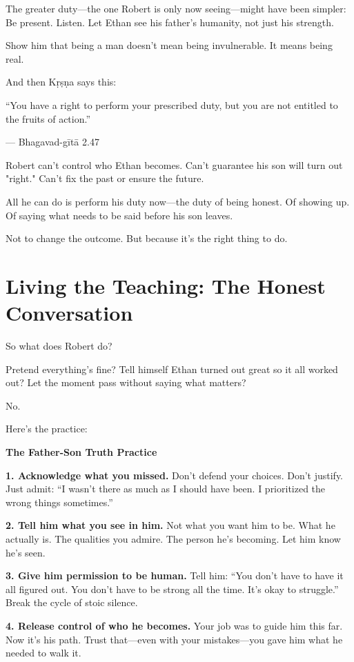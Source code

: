 \documentclass[11pt,twoside]{book}
\begin{document}
The greater duty—the one Robert is only now seeing—might have been simpler: Be present. Listen. Let Ethan see his father's humanity, not just his strength.

Show him that being a man doesn't mean being invulnerable. It means being real.

And then Kṛṣṇa says this:

\begin{pullquote}
``You have a right to perform your prescribed duty, but you are not entitled to the fruits of action.''

--- Bhagavad-gītā 2.47
\end{pullquote}

Robert can't control who Ethan becomes. Can't guarantee his son will turn out "right." Can't fix the past or ensure the future.

All he can do is perform his duty now—the duty of being honest. Of showing up. Of saying what needs to be said before his son leaves.

Not to change the outcome. But because it's the right thing to do.

\section*{Living the Teaching: The Honest Conversation}

So what does Robert do?

Pretend everything's fine? Tell himself Ethan turned out great so it all worked out? Let the moment pass without saying what matters?

No.

Here's the practice:

\begin{practicebox}
\textbf{The Father-Son Truth Practice}

\textbf{1. Acknowledge what you missed.}
Don't defend your choices. Don't justify. Just admit: ``I wasn't there as much as I should have been. I prioritized the wrong things sometimes.''

\textbf{2. Tell him what you see in him.}
Not what you want him to be. What he actually is. The qualities you admire. The person he's becoming. Let him know he's seen.

\textbf{3. Give him permission to be human.}
Tell him: ``You don't have to have it all figured out. You don't have to be strong all the time. It's okay to struggle.'' Break the cycle of stoic silence.

\textbf{4. Release control of who he becomes.}
Your job was to guide him this far. Now it's his path. Trust that—even with your mistakes—you gave him what he needed to walk it.
\end{practicebox}
\end{document}
